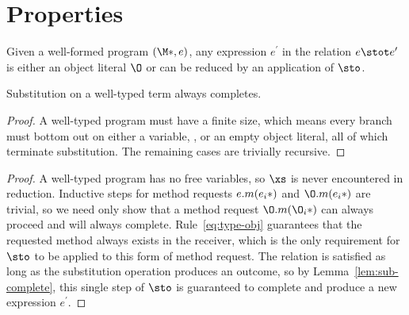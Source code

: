 \section{Properties}

\begin{theorem}[Progress]\label{th:progress}
  Given a well-formed program $(\*\M*, e)$, any expression $e^\prime$ in the
  relation $e \stot e^\prime$ is either an object literal $\O$ or can be reduced
  by an application of $\sto$.

  \begin{lemma}\label{lem:sub-complete}
    Substitution on a well-typed term always completes.

    \begin{proof}
      A well-typed program must have a finite size, which means every branch
      must bottom out on either a variable, \self, or an empty object literal,
      all of which terminate substitution.  The remaining cases are trivially
      recursive.
    \end{proof}
  \end{lemma}

  \begin{proof}
    A well-typed program has no free variables, so $\xs$ is never encountered in
    reduction.  Inductive steps for method requests $e.m(\*e_i*)$ and
    $\O.m(\*e_i*)$ are trivial, so we need only show that a method request
    $\O.m(\*\O_i*)$ can always proceed and will always complete.
    Rule~\ref{eq:type-obj} guarantees that the requested method always exists in
    the receiver, which is the only requirement for $\sto$ to be applied to this
    form of method request.  The relation is satisfied as long as the
    substitution operation produces an outcome, so by
    Lemma~\ref{lem:sub-complete}, this single step of $\sto$ is guaranteed to
    complete and produce a new expression $e^\prime$.
  \end{proof}
\end{theorem}

